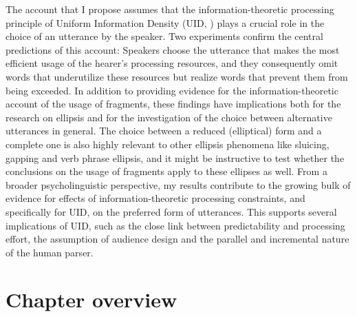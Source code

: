 The account that I propose assumes that the information-theoretic processing principle of Uniform Information Density (UID, ) plays a crucial role in the choice of an utterance by the speaker. Two experiments confirm the central predictions of this account: Speakers choose the utterance that makes the most efficient usage of the hearer's processing resources, and they consequently omit words that underutilize these resources but realize words that prevent them from being exceeded. In addition to providing evidence for the infor\-mation-theoretic account of the usage of fragments, these findings have implications both for the research on ellipsis and for the investigation of the choice between alternative utterances in general. The choice between a reduced (elliptical) form and  a complete one is also highly relevant to other ellipsis phenomena like sluicing, gapping and verb phrase ellipsis, and it might be instructive to test whether the conclusions on the usage of fragments apply to these ellipses as well. From a broader psycholinguistic perspective, my results contribute to the growing bulk of evidence for effects of information-theoretic processing constraints, and specifically for UID, on the preferred form of utterances. This supports several implications of UID, such as the close link between predictability and processing effort, the assumption of audience design and the parallel and incremental nature of the human parser.

\section{Chapter overview}

